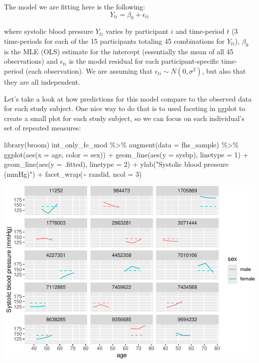 \documentclass[
]{book}
\newenvironment{Shaded}{\begin{snugshade}}{\end{snugshade}}
\newcommand{\AttributeTok}[1]{\textcolor[rgb]{0.77,0.63,0.00}{#1}}
\newcommand{\DecValTok}[1]{\textcolor[rgb]{0.00,0.00,0.81}{#1}}
\newcommand{\FunctionTok}[1]{\textcolor[rgb]{0.00,0.00,0.00}{#1}}
\newcommand{\NormalTok}[1]{#1}
\newcommand{\SpecialCharTok}[1]{\textcolor[rgb]{0.00,0.00,0.00}{#1}}
\newcommand{\StringTok}[1]{\textcolor[rgb]{0.31,0.60,0.02}{#1}}
\begin{document}
The model we are fitting here is the following:
\[
Y_{ti} = \beta_{0} + \epsilon_{ti}
\]

where systolic blood pressure \(Y_{ti}\) varies by participant \(i\) and time-period
\(t\) (3 time-periods for each of the 15 participants totaling 45 combinations
for \(Y_{ti}\)), \(\beta_{0}\) is the MLE (OLS) estimate for the intercept (essentially
the mean of all 45 observations) and \(\epsilon_{ti}\) is the model residual for each
participant-specific time-period (each observation). We are assuming that
\(\epsilon_{ti} \sim N(0,\sigma^2)\), but also that they are all independent.

Let's take a look at how predictions for this model compare to the observed data
for each study subject. One nice way to do that is to used faceting in ggplot to
create a small plot for each study subject, so we can focus on each individual's
set of repeated measures:

\begin{Shaded}
\begin{Highlighting}[]
\FunctionTok{library}\NormalTok{(broom)}
\NormalTok{int\_only\_fe\_mod }\SpecialCharTok{\%\textgreater{}\%} 
  \FunctionTok{augment}\NormalTok{(}\AttributeTok{data =}\NormalTok{ fhs\_sample) }\SpecialCharTok{\%\textgreater{}\%} 
  \FunctionTok{ggplot}\NormalTok{(}\FunctionTok{aes}\NormalTok{(}\AttributeTok{x =}\NormalTok{ age, }\AttributeTok{color =}\NormalTok{ sex)) }\SpecialCharTok{+} 
  \FunctionTok{geom\_line}\NormalTok{(}\FunctionTok{aes}\NormalTok{(}\AttributeTok{y =}\NormalTok{ sysbp), }\AttributeTok{linetype =} \DecValTok{1}\NormalTok{) }\SpecialCharTok{+} 
  \FunctionTok{geom\_line}\NormalTok{(}\FunctionTok{aes}\NormalTok{(}\AttributeTok{y =}\NormalTok{ .fitted), }\AttributeTok{linetype =} \DecValTok{2}\NormalTok{) }\SpecialCharTok{+} 
  \FunctionTok{ylab}\NormalTok{(}\StringTok{"Systolic blood pressure (mmHg)"}\NormalTok{) }\SpecialCharTok{+} 
  \FunctionTok{facet\_wrap}\NormalTok{(}\SpecialCharTok{\textasciitilde{}}\NormalTok{ randid, }\AttributeTok{ncol =} \DecValTok{3}\NormalTok{)}
\end{Highlighting}
\end{Shaded}

\includegraphics{adv_epi_analysis_files/figure-latex/unnamed-chunk-289-1.pdf}
\end{document}

